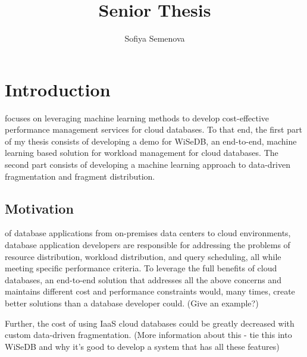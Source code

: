\documentclass{tufte-book} %
\title{Senior Thesis}
\author{Sofiya Semenova}
\begin{document}
\frontmatter

\maketitle

\tableofcontents

\mainmatter


\chapter{Introduction}

 focuses on leveraging machine learning methods to develop cost-effective performance management services for cloud databases. To that end, the first part of my thesis consists of developing a demo for WiSeDB, an end-to-end, machine learning based solution for workload management for cloud databases. The second part consists of developing a machine learning approach to data-driven fragmentation and fragment distribution.


\section{Motivation}

 of database applications from on-premises data centers to cloud environments, database application developers are responsible for addressing the problems of resource distribution, workload distribution, and query scheduling, all while meeting specific performance criteria. To leverage the full benefits of cloud databases, an end-to-end solution that addresses all the above concerns and maintains different cost and performance constraints would, many times, create better solutions than a database developer could. (Give an example?)

Further, the cost of using IaaS cloud databases could be greatly decreased with custom data-driven fragmentation. (More information about this - tie this into WiSeDB and why it's good to develop a system that has all these features)


\end{document}
